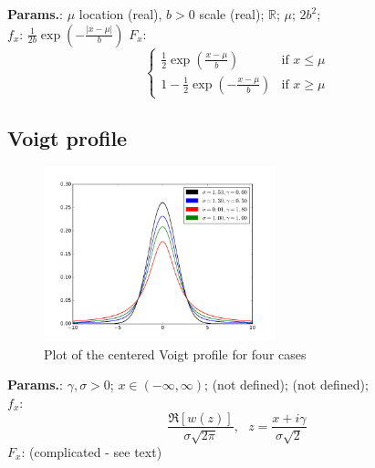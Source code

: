     {\color{darkblue} \textbf{Params.}:} {$\mu$ location (real),  $b > 0$ scale (real)}; {$\mathbb{R}$}; {$\mu$}; {$2b^2$};\hspace{0.5cm}\\{\color{darkblue} \textbf{$f_x$}:} {$\frac{1}{2b} \exp \left(-\frac{|x-\mu|}b \right)$}{\color{darkblue} \textbf{$F_x$}:} {$$\begin{cases}
                \frac{1}{2} \exp \left( \frac{x-\mu}{b} \right) & \text{if }x \leq \mu \\[8pt]
                1-\frac{1}{2} \exp \left( -\frac{x-\mu}{b} \right) & \text{if }x \geq \mu
              \end{cases}$$}



    
        
\subsection{Voigt profile}


    \begin{figure}[H]
        \centering
        \includegraphics[width=0.6\textwidth]{images/VoigtPDF.png}
        \caption{Plot of the centered Voigt profile for four cases}
    \end{figure}




    {\color{darkblue} \textbf{Params.}:} {$\gamma,\sigma>0$}; {$x\in(-\infty,\infty)$}; {(not defined)}; {(not defined)};\hspace{0.5cm}\\{\color{darkblue} \textbf{$f_x$}:} {$$\frac{\Re[w(z)]}{\sigma\sqrt{2\pi}},
              ~~~z=\frac{x+i\gamma}{\sigma\sqrt{2}}$$}{\color{darkblue} \textbf{$F_x$}:} {(complicated - see text)}



